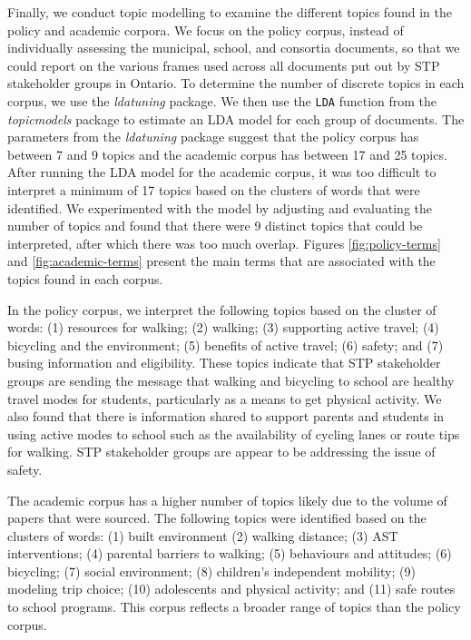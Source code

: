 \documentclass[]{elsarticle} %
\begin{document}
Finally, we conduct topic modelling to examine the different topics
found in the policy and academic corpora. We focus on the policy corpus,
instead of individually assessing the municipal, school, and consortia
documents, so that we could report on the various frames used across all
documents put out by STP stakeholder groups in Ontario. To determine the
number of discrete topics in each corpus, we use the \emph{ldatuning}
package. We then use the \texttt{LDA} function from the
\emph{topicmodels} package to estimate an LDA model for each group of
documents. The parameters from the \emph{ldatuning} package suggest that
the policy corpus has between 7 and 9 topics and the academic corpus has
between 17 and 25 topics. After running the LDA model for the academic
corpus, it was too difficult to interpret a minimum of 17 topics based
on the clusters of words that were identified. We experimented with the
model by adjusting and evaluating the number of topics and found that
there were 9 distinct topics that could be interpreted, after which
there was too much overlap. Figures \ref{fig:policy-terms} and
\ref{fig:academic-terms} present the main terms that are associated with
the topics found in each corpus.

In the policy corpus, we interpret the following topics based on the
cluster of words: (1) resources for walking; (2) walking; (3) supporting
active travel; (4) bicycling and the environment; (5) benefits of active
travel; (6) safety; and (7) busing information and eligibility. These
topics indicate that STP stakeholder groups are sending the message that
walking and bicycling to school are healthy travel modes for students,
particularly as a means to get physical activity. We also found that
there is information shared to support parents and students in using
active modes to school such as the availability of cycling lanes or
route tips for walking. STP stakeholder groups are appear to be
addressing the issue of safety.

The academic corpus has a higher number of topics likely due to the
volume of papers that were sourced. The following topics were identified
based on the clusters of words: (1) built environment (2) walking
distance; (3) AST interventions; (4) parental barriers to walking; (5)
behaviours and attitudes; (6) bicycling; (7) social environment; (8)
children's independent mobility; (9) modeling trip choice; (10)
adolescents and physical activity; and (11) safe routes to school
programs. This corpus reflects a broader range of topics than the policy
corpus.
\end{document}
